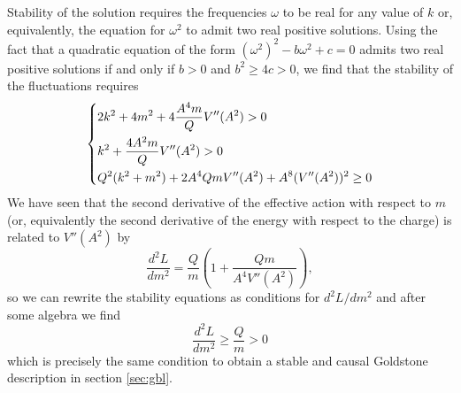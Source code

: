 \documentclass[11pt]{article}
\numberwithin{equation}{section}
\begin{document}
Stability of the solution requires  the frequencies \(\omega\) to be real for any value of \(k\) or, equivalently, the equation for \(\omega^2\) to admit two real positive solutions.
Using the fact that a quadratic equation of the form \((\omega^2)^2 - b \omega^2 + c = 0\) admits two real positive solutions if and only if \(b >0\) and \(b^2 \ge 4 c > 0\), we find that the stability of the fluctuations requires
\begin{equation}
  \begin{dcases}
    2 k^2 + 4 m^2 + 4 \frac{A^4 m}{Q} V''(A^2) > 0 \\
    k^2 + \frac{4 A^2 m}{Q} V''(A^2) > 0 \\
    Q^2( k^2 + m^2 ) + 2 A^4 Q m V''(A^2) + A^8 (V''(A^2))^2 \ge 0
  \end{dcases}
\end{equation}
We have seen that the second derivative of the effective action with respect to \(m\) (or, equivalently the second derivative of the energy with respect to the charge) is related to \(V''(A^2)\) by
\begin{equation}
  \frac{d^2L}{d m^2} =  \frac{Q}{m}\left( 1+ \frac{Q m}{A^4 V''(A^2)}  \right),
\end{equation}
so we can rewrite the stability equations as conditions for \(d^2 L / dm^2\) and after some algebra we find
\begin{equation}
  \frac{d^2L}{d m^2} \ge \frac{Q}{m} > 0
\end{equation}
which is precisely the same condition to obtain a stable and causal Goldstone description in section \ref{sec:gbl}.
\end{document}

